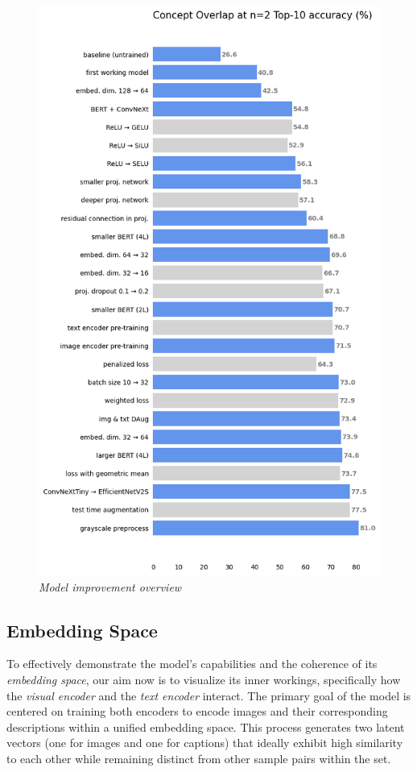 \documentclass[10pt,twocolumn,letterpaper]{article}
\begin{document}
\begin{figure}[H]
    \centering
    \includegraphics[width=1\linewidth]{img/Improvement_Plot.png}
    \caption{\textit{Model improvement overview}}
\end{figure}

\subsection{Embedding Space}

To effectively demonstrate the model's capabilities and the coherence of its \textit{embedding space}, our aim now is to visualize its inner workings, specifically how the \textit{visual encoder} and the \textit{text encoder} interact. The primary goal of the model is centered on training both encoders to encode images and their corresponding descriptions within a unified embedding space. This process generates two latent vectors (one for images and one for captions) that ideally exhibit high similarity to each other while remaining distinct from other sample pairs within the set.
\end{document}
